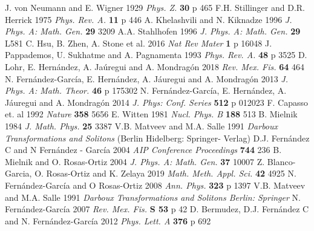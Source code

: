 \documentclass[a4paper]{jpconf}
\begin{document}
\begin{thebibliography}{9}
 J. von Neumann and E. Wigner 1929 {\it Phys. Z.} {\bf 30}  p 465
 F.H. Stillinger and D.R. Herrick 1975 {\it Phys. Rev. A.} {\bf 11} p 446 
 A. Khelashvili and N. Kiknadze 1996 {\it J. Phys. A: Math. Gen.} {\bf 29} 3209
 A.A. Stahlhofen 1996 {\it J. Phys. A: Math. Gen.} {\bf 29} L581
 C. Hsu, B. Zhen, A. Stone et al. 2016 {\it Nat Rev Mater} {\bf 1} p 16048
 J. Pappademos, U. Sukhatme and A. Pagnamenta 1993 {\it Phys. Rev. A.} {\bf 48} p 3525
 D. Lohr, E. Hern\' andez, A. Ja\' uregui and A. Mondrag\' on 2018 {\it Rev. Mex. Fis.} {\bf 64}  464
 N. Fern\' andez-Garc\' ia, E. Hern\' andez, A. J\' auregui and A. Mondrag\' on 2013 {\it J. Phys. A: Math. Theor.} {\bf 46} p 175302
 N. Fern\' andez-Garc\' ia, E. Hern\' andez, A. J\' auregui and A. Mondrag\' on 2014 {\it J. Phys: Conf. Series} {\bf 512} p 012023
F. Capasso et. al 1992 {\it Nature} {\bf 358} 5656
E. Witten 1981 {\it Nucl. Phys. B} {\bf 188}  513
 B. Mielnik 1984 {\it J. Math. Phys.} {\bf 25}  3387 
 V.B. Matveev and M.A. Salle 1991 {\it Darboux Transformations and Solitons} (Berlin Hidelberg: Springer- Verlag)
 D.J. Fern\' andez C and N Fern\' andez - Garc\' ia 2004 {\it AIP Conference Proceedings} {\bf 744} 236 
 B. Mielnik and O. Rosas-Ortiz 2004 {\it J. Phys. A: Math. Gen.} {\bf 37}  10007
 Z. Blanco-Garcia, O. Rosas-Ortiz and K. Zelaya 2019 {\it Math. Meth. Appl. Sci.} {\bf 42} 4925 
 N. Fern\' andez-Garc\' ia and O Rosas-Ortiz 2008 {\it Ann. Phys.} {\bf 323}  p 1397
 V.B. Matveev and M.A. Salle 1991 {\it Darboux Transformations and Solitons Berlin: Springer}
 N. Fern\' andez-Garc\' ia 2007 {\it Rev. Mex. Fis.} {\bf S 53} p 42
 D. Bermudez, D.J. Fern\' andez C and N. Fern\' andez-Garc\' ia 2012 {\it Phys. Lett. A} {\bf 376} p 692
\end{thebibliography}
\end{document}
